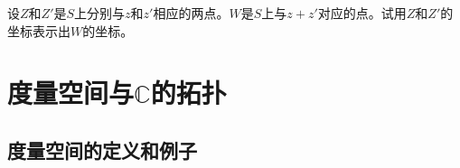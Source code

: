 \begin{exercise}
设$Z$和$Z'$是$S$上分别与$z$和$z'$相应的两点。$W$是$S$上与$z+z'$对应的点。试用$Z$和$Z'$的坐标表示出$W$的坐标。
\end{exercise}

\section{度量空间与$\mathbb{C}$的拓扑}\label{section00202}

\subsection{度量空间的定义和例子}\label{subsection0020201}











